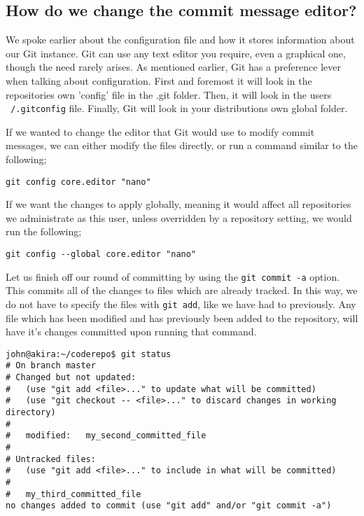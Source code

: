 \subsection*{How do we change the commit message editor?}

We spoke earlier about the configuration file and how it stores information about our Git instance.  Git can use any text editor you require, even a graphical one, though the need rarely arises.  As mentioned earlier, Git has a preference lever when talking about configuration.  First and foremost it will look in the repositories own 'config' file in the .git folder.  Then, it will look in the users \texttt{~/.gitconfig} file.  Finally, Git will look in your distributions own global folder.  

If we wanted to change the editor that Git would use to modify commit messages, we can either modify the files directly, or run a command similar to the following;

\begin{verbatim} 
git config core.editor "nano"
\end{verbatim}

If we want the changes to apply globally, meaning it would affect all repositories we administrate as this user, unless overridden by a repository setting, we would run the following;

\begin{verbatim} 
git config --global core.editor "nano"
\end{verbatim}

Let us finish off our round of committing by using the \texttt{git commit -a} option.  This commits all of the changes to files which are already tracked.  In this way, we do not have to specify the files with \texttt{git add}, like we have had to previously.  Any file which has been modified and has previously been added to the repository, will have it's changes committed upon running that command.

\begin{verbatim} 
john@akira:~/coderepo$ git status 
# On branch master 
# Changed but not updated: 
#   (use "git add <file>..." to update what will be committed) 
#   (use "git checkout -- <file>..." to discard changes in working directory) 
# 
#	modified:   my_second_committed_file 
# 
# Untracked files: 
#   (use "git add <file>..." to include in what will be committed) 
# 
#	my_third_committed_file 
no changes added to commit (use "git add" and/or "git commit -a")
\end{verbatim} 

